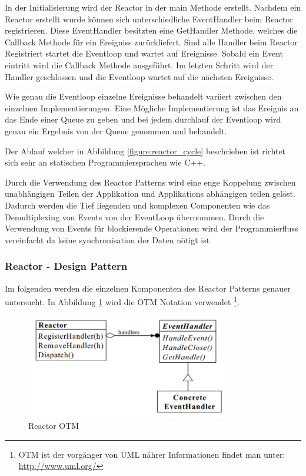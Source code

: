 In der Initialisierung wird der Reactor in der main Methode erstellt. Nachdem ein Reactor erstellt wurde können sich unterschiedliche EventHandler beim Reactor registrieren. Diese EventHandler besitzten eine GetHandler Methode, welches die Callback Methode für ein Ereigniss zurückliefert. Sind alle Handler beim Reactor Registriert startet die Eventloop und wartet auf Ereignisse. Sobald ein Event eintritt wird die Callback Methode ausgeführt. Im letzten Schritt wird der Handler geschlossen und die Eventloop wartet auf die nächsten Ereignisse. 

Wie genau die Eventloop einzelne Ereignisse behandelt variiert zwischen den einzelnen Implementierungen. Eine Mögliche Implementierung ist das Ereignis an das Ende einer Queue zu geben und bei jedem durchlauf der Eventloop wird genau ein Ergebnis von der Queue genommen und behandelt.

Der Ablauf welcher in Abbildung \ref{figure:reactor_cycle} beschrieben ist richtet sich sehr an statischen Programmiersprachen wie C++.

Durch die Verwendung des Reactor Patterns wird eine enge Koppelung zwischen unabhängigen Teilen der Applikation und Applikations abhängigen teilen gelöst. Dadurch werden die Tief liegenden und komplexen Componenten wie das Demultiplexing von Events von der EventLoop übernommen. Durch die Verwendung von Events für blockierende Operationen wird der Programmierfluss vereinfacht da keine synchronisation der Daten nötigt ist \cite[p. 2]{Sch95}

\subsubsection{Reactor - Design Pattern}

Im folgenden werden die einzelnen Komponenten des Reactor Patterns genauer untersucht. In Abbildung \ref{figure:reactor_otm} wird die OTM Notation verwendet \footnote[0]{OTM ist der vorgänger von UML nährer Informationen findet man unter: \url{http://www.uml.org/}}.

\begin{figure}[!htb]
  \centering
  \includegraphics[width=9cm]{images/reactor_otm.png}
  \caption{
    Reactor OTM \cite[p. 4]{Sch95}
  }
  \label{figure:reactor_otm}
\end{figure}

